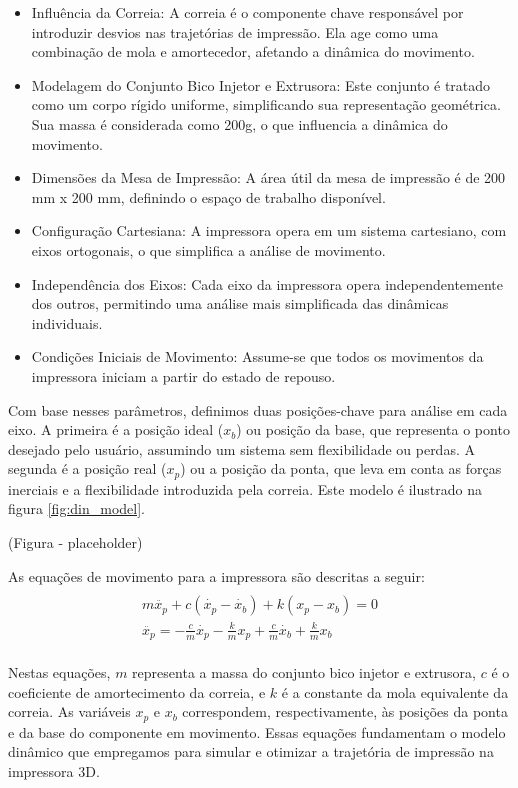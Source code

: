 \begin{itemize}
    \item Influência da Correia: A correia é o componente chave responsável por introduzir desvios nas trajetórias de impressão. Ela age como uma combinação de mola e amortecedor, afetando a dinâmica do movimento.
    \item Modelagem do Conjunto Bico Injetor e Extrusora: Este conjunto é tratado como um corpo rígido uniforme, simplificando sua representação geométrica. Sua massa é considerada como 200g, o que influencia a dinâmica do movimento.
    \item Dimensões da Mesa de Impressão: A área útil da mesa de impressão é de 200 mm x 200 mm, definindo o espaço de trabalho disponível.
    \item Configuração Cartesiana: A impressora opera em um sistema cartesiano, com eixos ortogonais, o que simplifica a análise de movimento.
    \item Independência dos Eixos: Cada eixo da impressora opera independentemente dos outros, permitindo uma análise mais simplificada das dinâmicas individuais.
    \item Condições Iniciais de Movimento: Assume-se que todos os movimentos da impressora iniciam a partir do estado de repouso.
\end{itemize}

Com base nesses parâmetros, definimos duas posições-chave para análise em cada eixo. A primeira é a posição ideal (\(x_b\)) ou posição da base, que representa o ponto desejado pelo usuário, assumindo um sistema sem flexibilidade ou perdas. A segunda é a posição real (\(x_p\)) ou a posição da ponta, que leva em conta as forças inerciais e a flexibilidade introduzida pela correia. Este modelo é ilustrado na figura \ref{fig:din_model}.

(Figura - placeholder)

As equações de movimento para a impressora são descritas a seguir:
\begin{multline}
    \label{eq:mov_impressora}
    \\
    m \ddot{x_p} + c(\dot{x_p} - \dot{x_b}) + k(x_p-x_b) = 0 \\
    \ddot{x_p} = - \frac{c}{m} \dot{x_p} - \frac{k}{m} x_p + \frac{c}{m} \dot{x_b} + \frac{k}{m} x_b \\
\end{multline}

Nestas equações, \(m\) representa a massa do conjunto bico injetor e extrusora, \(c\) é o coeficiente de amortecimento da correia, e \(k\) é a constante da mola equivalente da correia. As variáveis \(x_p\) e \(x_b\) correspondem, respectivamente, às posições da ponta e da base do componente em movimento. Essas equações fundamentam o modelo dinâmico que empregamos para simular e otimizar a trajetória de impressão na impressora 3D.

